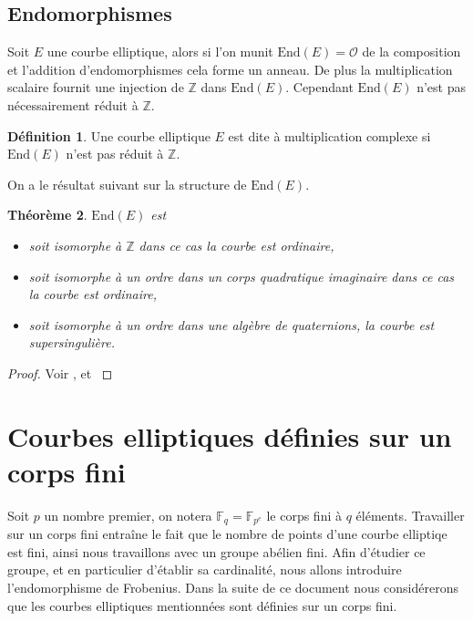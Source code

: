 \documentclass[10pt,a4paper]{book}
\theoremstyle{plain}
\newtheorem{thm}{Théorème}[chapter]
\theoremstyle{definition}
\theoremstyle{definition}
\theoremstyle{definition}
\theoremstyle{definition}
\theoremstyle{definition}
\newtheorem{defi}[thm]{Définition}
\theoremstyle{remark}
\theoremstyle{remark}
\theoremstyle{definition}
\begin{document}
\subsection{Endomorphismes}

Soit $E$ une courbe elliptique, alors si l'on munit $\mathrm{End}(E)=\mathcal{O}$ de la composition et l'addition d'endomorphismes cela forme un anneau. De plus la multiplication scalaire fournit une injection de $\mathbb{Z}$ dans $\mathrm{End}(E)$. Cependant $\mathrm{End}(E)$ n'est pas nécessairement réduit à $\mathbb{Z}$.

\begin{defi}
Une courbe elliptique $E$ est dite à multiplication complexe si $\mathrm{End}(E)$ n'est pas réduit à $\mathbb{Z}$.
\end{defi}
On a le résultat suivant sur la structure de $\mathrm{End}(E)$.

\begin{thm}
$\mathrm{End}(E)$ est
\begin{itemize}
\item soit isomorphe à $\mathbb{Z}$ dans ce cas la courbe est \emph{ordinaire}, 
\item soit isomorphe à un ordre dans un corps quadratique imaginaire dans ce cas la courbe est \emph{ordinaire}, 
\item soit isomorphe à un ordre dans une algèbre de quaternions, la courbe est \emph{supersingulière}. 
\end{itemize}
\end{thm}

\begin{proof}
Voir \cite[Corollary III.9.4]{Silv1}, et \cite[Theorem V.3.1]{Silv1}
\end{proof}

\section{Courbes elliptiques définies sur un corps fini}

Soit $p$ un nombre premier, on notera $\mathbb{F}_q=\mathbb{F}_{p^e}$ le corps 
fini à $q$ éléments. Travailler sur un corps fini entraîne le fait que le 
nombre de points d'une courbe elliptiqe est fini, ainsi nous travaillons avec 
un groupe abélien fini. Afin d'étudier ce groupe, et en particulier d'établir 
sa cardinalité, nous allons introduire l'endomorphisme de Frobenius. Dans la 
suite de ce document nous considérerons que les courbes elliptiques mentionnées
sont définies sur un corps fini.
\end{document}

